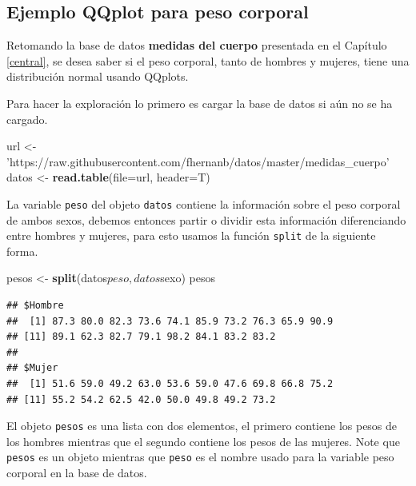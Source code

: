 \documentclass[10pt,]{krantz}
\makeatletter
\newenvironment{Shaded}{\begin{snugshade}}{\end{snugshade}}
\newcommand{\KeywordTok}[1]{\textcolor[rgb]{0.13,0.29,0.53}{\textbf{{#1}}}}
\newcommand{\DataTypeTok}[1]{\textcolor[rgb]{0.13,0.29,0.53}{{#1}}}
\newcommand{\StringTok}[1]{\textcolor[rgb]{0.31,0.60,0.02}{{#1}}}
\newcommand{\NormalTok}[1]{{#1}}
\newenvironment{kframe}{%
\medskip{}
\setlength{\fboxsep}{.8em}
 \def\at@end@of@kframe{}%
 \ifinner\ifhmode%
  \def\at@end@of@kframe{\end{minipage}}%
  \begin{minipage}{\columnwidth}%
 \fi\fi%
 \def\FrameCommand##1{\hskip\@totalleftmargin \hskip-\fboxsep
 \colorbox{shadecolor}{##1}\hskip-\fboxsep
     \hskip-\linewidth \hskip-\@totalleftmargin \hskip\columnwidth}%
 \MakeFramed {\advance\hsize-\width
   \@totalleftmargin\z@ \linewidth\hsize
   \@setminipage}}%
 {\par\unskip\endMakeFramed%
 \at@end@of@kframe}
\renewenvironment{Shaded}{\begin{kframe}}{\end{kframe}}
\makeatother
\begin{document}
\subsection*{Ejemplo QQplot para peso
corporal}\label{ejemplo-qqplot-para-peso-corporal}


Retomando la base de datos \textbf{medidas del cuerpo} presentada en el
Capítulo \ref{central}, se desea saber si el peso corporal, tanto de
hombres y mujeres, tiene una distribución normal usando QQplots.

Para hacer la exploración lo primero es cargar la base de datos si aún
no se ha cargado.

\begin{Shaded}
\begin{Highlighting}[]
\NormalTok{url <-}\StringTok{ 'https://raw.githubusercontent.com/fhernanb/datos/master/medidas_cuerpo'}
\NormalTok{datos <-}\StringTok{ }\KeywordTok{read.table}\NormalTok{(}\DataTypeTok{file=}\NormalTok{url, }\DataTypeTok{header=}\NormalTok{T)}
\end{Highlighting}
\end{Shaded}

La variable \texttt{peso} del objeto \texttt{datos} contiene la
información sobre el peso corporal de ambos sexos, debemos entonces
partir o dividir esta información diferenciando entre hombres y mujeres,
para esto usamos la función \texttt{split} de la siguiente forma.

\begin{Shaded}
\begin{Highlighting}[]
\NormalTok{pesos <-}\StringTok{ }\KeywordTok{split}\NormalTok{(datos$peso, datos$sexo)}
\NormalTok{pesos}
\end{Highlighting}
\end{Shaded}

\begin{verbatim}
## $Hombre
##  [1] 87.3 80.0 82.3 73.6 74.1 85.9 73.2 76.3 65.9 90.9
## [11] 89.1 62.3 82.7 79.1 98.2 84.1 83.2 83.2
## 
## $Mujer
##  [1] 51.6 59.0 49.2 63.0 53.6 59.0 47.6 69.8 66.8 75.2
## [11] 55.2 54.2 62.5 42.0 50.0 49.8 49.2 73.2
\end{verbatim}

El objeto \texttt{pesos} es una lista con dos elementos, el primero
contiene los pesos de los hombres mientras que el segundo contiene los
pesos de las mujeres. Note que \texttt{pesos} es un objeto mientras que
\texttt{peso} es el nombre usado para la variable peso corporal en la
base de datos.
\end{document}
